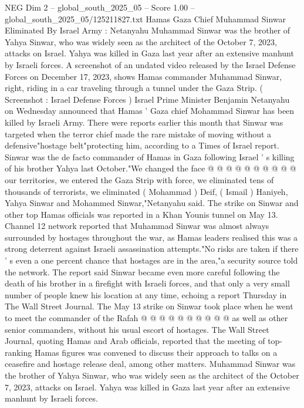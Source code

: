 \begin{textsample}{NEG Dim 2 – global\_south\_2025\_05 – Score 1.00 – global\_south\_2025\_05/125211827.txt}  \label{ex:f2_neg_401}
Hamas Gaza Chief Muhammad Sinwar Eliminated By Israel Army : Netanyahu Muhammad Sinwar was the brother of Yahya Sinwar, who was widely seen as the architect of the October 7, 2023, attacks on Israel.
Yahya was killed in Gaza last year after an extensive manhunt by Israeli forces.
A screenshot of an undated video released by the Israel Defense Forces on December 17, 2023, shows Hamas commander Muhammad Sinwar, right, riding in a car traveling through a tunnel under the Gaza Strip. ( Screenshot : Israel Defense Forces ) Israel Prime Minister Benjamin Netanyahu on Wednesday announced that Hamas ' Gaza chief Mohammad Sinwar has been killed by Israeli Army.
There were reports earlier this month that Sinwar was targeted when the terror chief made the rare mistake of moving without a defensive"hostage belt"protecting him, according to a Times of Israel report.
Sinwar was the de facto commander of Hamas in Gaza following Israel ' s killing of his brother Yahya last October."We changed the face @ @ @ @ @ @ @ @ @ @ our territories, we entered the Gaza Strip with force, we eliminated tens of thousands of terrorists, we eliminated ( Mohammad ) Deif, ( Ismail ) Haniyeh, Yahya Sinwar and Mohammed Sinwar,"Netanyahu said.
The strike on Sinwar and other top Hamas officials was reported in a Khan Younis tunnel on May 13.
Channel 12 network reported that Muhammad Sinwar was almost always surrounded by hostages throughout the war, as Hamas leaders realised this was a strong deterrent against Israeli assassination attempts."No risks are taken if there ' s even a one percent chance that hostages are in the area,"a security source told the network.
The report said Sinwar became even more careful following the death of his brother in a firefight with Israeli forces, and that only a very small number of people knew his location at any time, echoing a report Thursday in The Wall Street Journal.
The May 13 strike on Sinwar took place when he went to meet the commander of the Rafah @ @ @ @ @ @ @ @ @ @ as well as other senior commanders, without his usual escort of hostages.
The Wall Street Journal, quoting Hamas and Arab officials, reported that the meeting of top-ranking Hamas figures was convened to discuss their approach to talks on a ceasefire and hostage release deal, among other matters.
Muhammad Sinwar was the brother of Yahya Sinwar, who was widely seen as the architect of the October 7, 2023, attacks on Israel.
Yahya was killed in Gaza last year after an extensive manhunt by Israeli forces.

\end{textsample}
